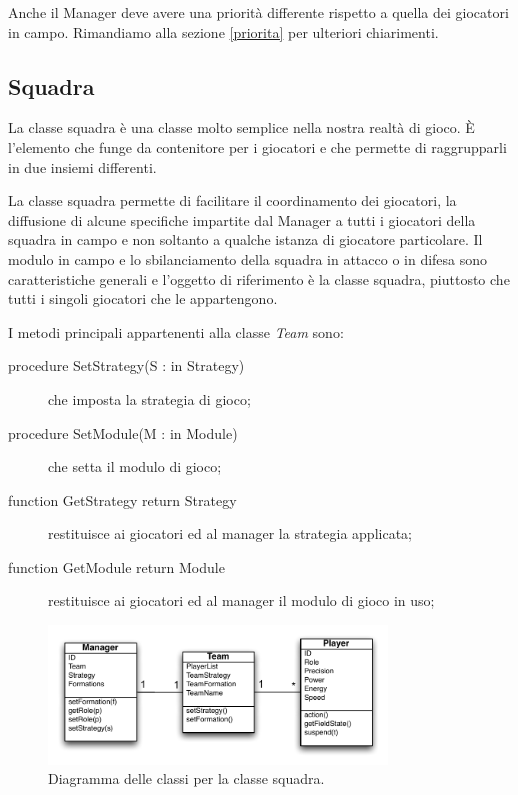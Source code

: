 \documentclass[aps,letterpaper,10pt]{article}
\begin{document}
Anche il Manager deve avere una priorit\`a differente rispetto a quella dei giocatori in campo. Rimandiamo alla sezione \ref{priorita} per ulteriori chiarimenti.

\subsection{Squadra}
\label{squadra}

La classe squadra \`e una classe molto semplice nella nostra realt\`a di gioco. \`E l'elemento che funge da contenitore per i giocatori e che permette di raggrupparli in due insiemi differenti. \vspace{3mm}

La classe squadra permette di facilitare il coordinamento dei giocatori, la diffusione di alcune specifiche impartite dal Manager a tutti i giocatori della squadra in campo e non soltanto a qualche istanza di giocatore particolare. Il modulo in campo e lo sbilanciamento della squadra in attacco o in difesa sono caratteristiche generali e l'oggetto di riferimento \`e la classe squadra, piuttosto che tutti i singoli giocatori che le appartengono. \vspace{3mm}

I metodi principali appartenenti alla classe \emph{Team} sono:

\begin{description}
	\item[procedure SetStrategy(S : in Strategy)] che imposta la strategia di gioco;
	\item[procedure SetModule(M : in Module)] che setta il modulo di gioco;
	\item[function GetStrategy return Strategy] restituisce ai giocatori ed al manager la strategia applicata;
	\item[function GetModule return Module] restituisce ai giocatori ed al manager il modulo di gioco in uso;
\end{description}

\begin{figure}[H]
	\begin{center}
		\includegraphics[width=340px]{images/team-class.pdf}
	\end{center}
\caption{Diagramma delle classi per la classe squadra.}
\end{figure}
\end{document}
